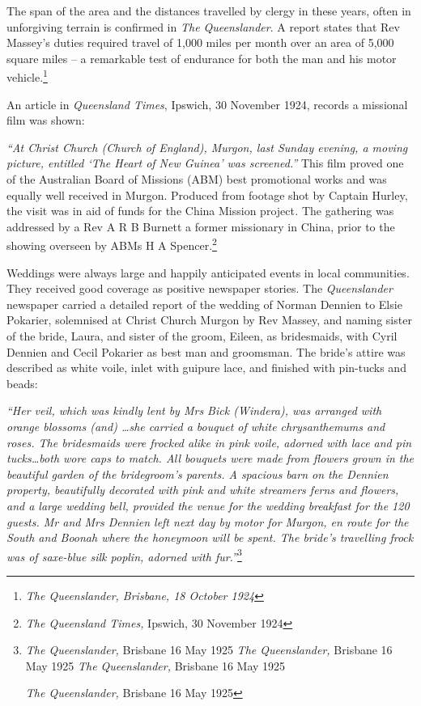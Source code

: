 The span of the area and the distances travelled by clergy in these years, often in unforgiving terrain is confirmed in \emph{The Queenslander}. A report states that Rev Massey's duties required travel of 1,000 miles per month over an area of 5,000 square miles -- a remarkable test of endurance for both the man and his motor vehicle.\footnote{\emph{The Queenslander, Brisbane, 18 October 1924}}


An article in \emph{Queensland Times}, Ipswich, 30 November 1924, records a missional film was shown:



\emph{``At Christ Church (Church of England), Murgon, last Sunday evening, a moving picture, entitled `The Heart of New Guinea' was screened.''} This film proved one of the Australian Board of Missions (ABM) best promotional works and was equally well received in Murgon. Produced from footage shot by Captain Hurley, the visit was in aid of funds for the China Mission project\emph{.} The gathering was addressed by a Rev A R B Burnett a former missionary in China, prior to the showing overseen by ABMs H A Spencer.\footnote{\emph{The Queensland Times,} Ipswich, 30 November 1924}


Weddings were always large and happily anticipated events in local communities. They received good coverage as positive newspaper stories. The \emph{Queenslander} newspaper carried a detailed report of the wedding of Norman Dennien to Elsie Pokarier, solemnised at Christ Church Murgon by Rev Massey, and naming sister of the bride, Laura, and sister of the groom, Eileen, as bridesmaids, with Cyril Dennien and Cecil Pokarier as best man and groomsman. The bride's attire was described as white voile, inlet with guipure lace, and finished with pin-tucks and beads:



\emph{``Her veil, which was kindly lent by Mrs Bick (Windera), was arranged with orange blossoms (and) \ldots she carried a bouquet of white chrysanthemums and roses. The bridesmaids were frocked alike in pink voile, adorned with lace and pin tucks\ldots both wore caps to match. All bouquets were made from flowers grown in the beautiful garden of the bridegroom's parents. A spacious barn on the Dennien property, beautifully decorated with pink and white streamers ferns and flowers, and a large wedding bell, provided the venue for the wedding breakfast for the 120 guests. Mr and Mrs Dennien left next day by motor for Murgon, en route for the South and Boonah where the honeymoon will be spent. The bride's travelling frock was of saxe-blue silk poplin, adorned with fur.''}\footnote{\emph{The Queenslander,} Brisbane 16 May 1925 \emph{The Queenslander,} Brisbane 16 May 1925 \emph{The Queenslander,} Brisbane 16 May 1925


  \emph{The Queenslander,} Brisbane 16 May 1925}



